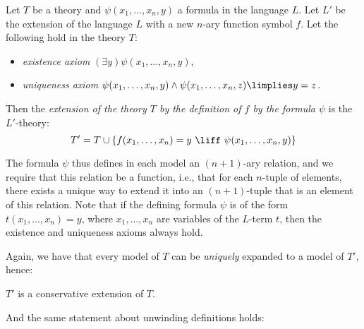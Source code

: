 \begin{definition}
    Let $T$ be a theory and $\psi(x_1,\dots,x_n,y)$ a formula in the language $L$. Let $L'$ be the extension of the language $L$ with a new $n$-ary function symbol $f$. Let the following hold in the theory $T$:
    \begin{itemize}
        \item \emph{existence axiom} $(\exists y)\psi(x_1,\dots,x_n,y)$,
        \item \emph{uniqueness axiom} $\psi(x_1,\dots,x_n,y)\land \psi(x_1,\dots,x_n,z)\limplies y=z$.
    \end{itemize}
    Then the \emph{extension of the theory $T$ by the definition of $f$ by the formula $\psi$} is the $L'$-theory:
    $$T'=T\cup\{f(x_1,\dots,x_n)=y\ \liff\ \psi(x_1,\dots,x_n,y)\}$$
\end{definition}

The formula $\psi$ thus defines in each model an $(n+1)$-ary relation, and we require that this relation be a function, i.e., that for each $n$-tuple of elements, there exists a unique way to extend it into an $(n+1)$-tuple that is an element of this relation. Note that if the defining formula $\psi$ is of the form $t(x_1,\dots,x_n)=y$, where $x_1,\dots,x_n$ are variables of the $L$-term $t$, then the existence and uniqueness axioms always hold.

Again, we have that every model of $T$ can be \emph{uniquely} expanded to a model of $T'$, hence:
\begin{corollary}
    $T'$ is a conservative extension of $T$.
\end{corollary}

And the same statement about unwinding definitions holds:

